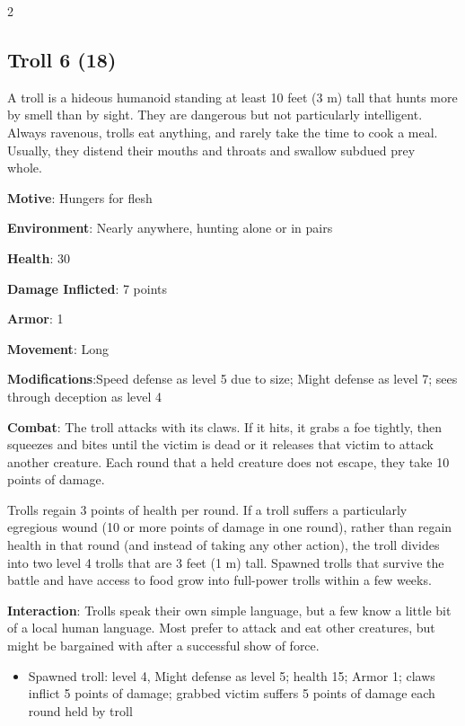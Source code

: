\begin{multicols}{2}
\subsection{Troll 6 (18)}

A troll is a hideous humanoid standing at least 10 feet (3 m) tall that hunts more by smell than by sight. They are dangerous but not particularly intelligent. Always ravenous, trolls eat anything, and rarely take the time to cook a meal. Usually, they distend their mouths and throats and swallow subdued prey whole. 

\textbf{Motive}: Hungers for flesh 

\textbf{Environment}: Nearly anywhere, hunting alone or in pairs 

\textbf{Health}: 30 

\textbf{Damage Inflicted}: 7 points 

\textbf{Armor}: 1 

\textbf{Movement}: Long 

\textbf{Modifications}:Speed defense as level 5 due to size; Might defense as level 7; sees through deception as level 4 

\textbf{Combat}: The troll attacks with its claws. If it hits, it grabs a foe tightly, then squeezes and bites until the victim is dead or it releases that victim to attack another creature. Each round that a held creature does not escape, they take 10 points of damage. 

Trolls regain 3 points of health per round. If a troll suffers a particularly egregious wound (10 or more points of damage in one round), rather than regain health in that round (and instead of taking any other action), the troll divides into two level 4 trolls that are 3 feet (1 m) tall. Spawned trolls that survive the battle and have access to food grow into full-power trolls within a few weeks. 

\textbf{Interaction}: Trolls speak their own simple language, but a few know a little bit of a local human language. Most prefer to attack and eat other creatures, but might be bargained with after a successful show of force. 

\begin{itemize}
\item Spawned troll: level 4, Might defense as level 5; health 15; Armor 1; claws inflict 5 points of damage;  grabbed victim suffers 5 points of damage each round held by troll
\end{itemize}


\end{multicols}
